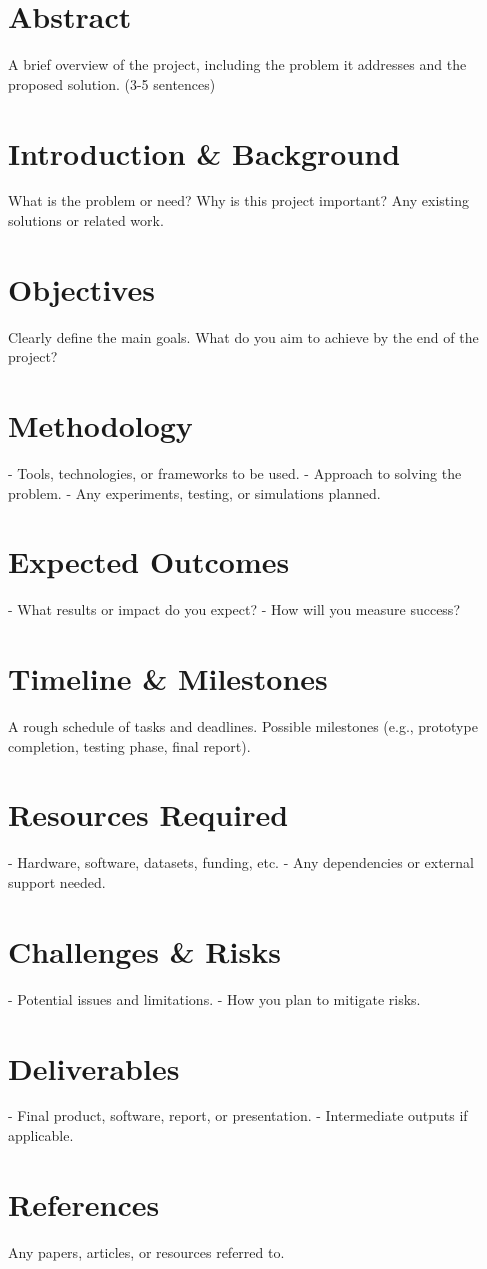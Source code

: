 \documentclass[a4paper,12pt]{article}
\begin{document}
\newpage

\section*{Abstract}
\noindent A brief overview of the project, including the problem it addresses and the proposed solution. (3-5 sentences)

\section*{Introduction \& Background}
\noindent What is the problem or need?  
Why is this project important?  
Any existing solutions or related work.

\section*{Objectives}
\noindent Clearly define the main goals.  
What do you aim to achieve by the end of the project?

\section*{Methodology}
\noindent - Tools, technologies, or frameworks to be used.  
- Approach to solving the problem.  
- Any experiments, testing, or simulations planned.

\section*{Expected Outcomes}
\noindent - What results or impact do you expect?  
- How will you measure success?

\section*{Timeline \& Milestones}
\noindent A rough schedule of tasks and deadlines.  
Possible milestones (e.g., prototype completion, testing phase, final report).

\section*{Resources Required}
\noindent - Hardware, software, datasets, funding, etc.  
- Any dependencies or external support needed.

\section*{Challenges \& Risks}
\noindent - Potential issues and limitations.  
- How you plan to mitigate risks.

\section*{Deliverables}
\noindent - Final product, software, report, or presentation.  
- Intermediate outputs if applicable.

\section*{References}
\noindent Any papers, articles, or resources referred to.
\end{document}
